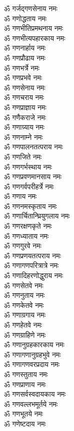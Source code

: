 \begin{multicols}{2}
\begin{flushleft}
ॐ गर्जद्गणसेनाय नमः\\
ॐ गणोद्धताय नमः\\
ॐ गणभीतिप्रमथनाय नमः\\
ॐ गणभीत्यपहारकाय नमः\\
ॐ गणनार्हाय नमः\\
ॐ गणप्रौढाय नमः\\
ॐ गणभर्त्रे नमः\\
ॐ गणप्रभवे नमः\\
ॐ गणसेनाय नमः\\
ॐ गणचराय नमः\hfill{}\\
ॐ गणप्राज्ञाय नमः\\
ॐ गणैकराजे नमः\\
ॐ गणाग्र्याय नमः\\
ॐ गणनाम्ने नमः\\
ॐ गणपालनतत्पराय नमः\\
ॐ गणजिते नमः\\
ॐ गणगर्भस्थाय नमः\\
ॐ गणप्रवणमानसाय नमः\\
ॐ गणगर्वपरीहर्त्रे नमः\\
ॐ गणाय नमः\hfill{}\\
ॐ गणनमस्कृताय नमः\\
ॐ गणार्चितान्घ्रियुगलाय नमः\\
ॐ गणरक्षणकृते नमः\\
ॐ गणध्याताय नमः\\
ॐ गणगुरवे नमः\\
ॐ गणप्रणयतत्पराय नमः\\
ॐ गणागणपरित्रात्रे नमः\\
ॐ गणादिहरणोद्धुराय नमः\\
ॐ गणसेतवे नमः\\
ॐ गणनुताय नमः\hfill{}\\
ॐ गणकेतवे नमः\\
ॐ गणाग्रगाय नमः\\
ॐ गणहेतवे नमः\\
ॐ गणग्राहिणे नमः\\
ॐ गणानुग्रहकारकाय नमः\\
ॐ गणागणानुग्रहभुवे नमः\\
ॐ गणागणवरप्रदाय नमः\\
ॐ गणस्तुताय नमः\\
ॐ गणप्राणाय नमः\\
ॐ गणसर्वस्वदायकाय नमः\hfill{}\\
ॐ गणवल्लभमूर्तये नमः\\
ॐ गणभूतये नमः\\
ॐ गणेष्टदाय नमः\\

\end{flushleft}
\end{multicols}
